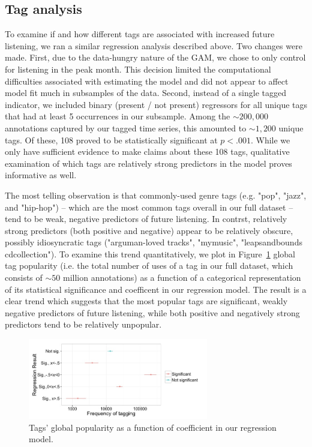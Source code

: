 \subsection{Tag analysis}
To examine if and how different tags are associated with increased future listening, we ran a similar regression analysis described above.  Two changes were made. First, due to the data-hungry nature of the GAM, we chose to only control for listening in the peak month. This decision limited the computational difficulties associated with estimating the model and did not appear to affect model fit much in subsamples of the data.  Second, instead of a single tagged indicator, we included binary (present / not present) regressors for all unique tags that had at least 5 occurrences in our subsample. Among the $\sim200,000$ annotations captured by our tagged time series, this amounted to $\sim1,200$ unique tags. Of these, 108 proved to be statistically significant at $p <.001$. While we only have sufficient evidence to make claims about these 108 tags, qualitative examination of which tags are relatively strong predictors in the model proves informative as well.

The most telling observation is that commonly-used genre tags (e.g. "pop", "jazz", and "hip-hop") -- which are the most common tags overall in our full dataset -- tend to be weak, negative predictors of future listening. In contrst, relatively strong predictors (both positive and negative) appear to be relatively obscure, possibly idiosyncratic tags ("arguman-loved tracks", "mymusic", "leapsandbounds cdcollection").  To examine this trend quantitatively, we plot in Figure~\ref{fig:coefVsPopularity} global tag popularity (i.e. the total number of uses of a tag in our full dataset, which consists of $\sim 50$ million annotations) as a function of a categorical representation of its statistical significance and coefficent in our regression model. The result is a clear trend which suggests that the most popular tags are significant, weakly negative predictors of future listening, while both positive and negatively strong predictors tend to be relatively unpopular.

  \begin{figure}
	\centering
      \includegraphics[width=0.7\textwidth]{tagRegressionQualAnalysis}
    \caption{Tags' global popularity as a function of coefficient in our regression model.}
    \label{fig:coefVsPopularity}
  \end{figure}

